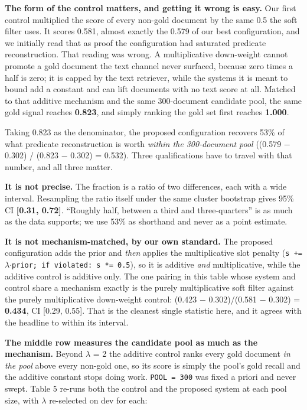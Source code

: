 \documentclass[acmsmall]{acmart}
\begin{document}
\textbf{The form of the control matters, and getting it wrong is easy.} Our first control multiplied the score of every non-gold document by the same 0.5 the soft filter uses. It scores 0.581, almost exactly the 0.579 of our best configuration, and we initially read that as proof the configuration had saturated predicate reconstruction. That reading was wrong. A multiplicative down-weight cannot promote a gold document the text channel never surfaced, because zero times a half is zero; it is capped by the text retriever, while the systems it is meant to bound add a constant and can lift documents with no text score at all. Matched to that additive mechanism and the same 300-document candidate pool, the same gold signal reaches \textbf{0.823}, and simply ranking the gold set first reaches \textbf{1.000}.

Taking 0.823 as the denominator, the proposed configuration recovers 53\% of what predicate reconstruction is worth \textit{within the 300-document pool} ((0.579 $-$ 0.302) / (0.823 $-$ 0.302) = 0.532). Three qualifications have to travel with that number, and all three matter.

\textbf{It is not precise.} The fraction is a ratio of two differences, each with a wide interval. Resampling the ratio itself under the same cluster bootstrap gives 95\% CI \textbf{[0.31, 0.72]}. ``Roughly half, between a third and three-quarters'' is as much as the data supports; we use 53\% as shorthand and never as a point estimate.

\textbf{It is not mechanism-matched, by our own standard.} The proposed configuration adds the prior and \textit{then} applies the multiplicative slot penalty (\texttt{s += $\lambda$$\cdot$prior; if violated: s *= 0.5}), so it is additive \textit{and} multiplicative, while the additive control is additive only. The one pairing in this table whose system and control share a mechanism exactly is the purely multiplicative soft filter against the purely multiplicative down-weight control: (0.423 $-$ 0.302)/(0.581 $-$ 0.302) = \textbf{0.434}, CI [0.29, 0.55]. That is the cleanest single statistic here, and it agrees with the headline to within its interval.

\textbf{The middle row measures the candidate pool as much as the mechanism.} Beyond $\lambda$ = 2 the additive control ranks every gold document \textit{in the pool} above every non-gold one, so its score is simply the pool's gold recall and the additive constant stops doing work. \texttt{POOL = 300} was fixed a priori and never swept. Table 5 re-runs both the control and the proposed system at each pool size, with $\lambda$ re-selected on dev for each:
\end{document}
